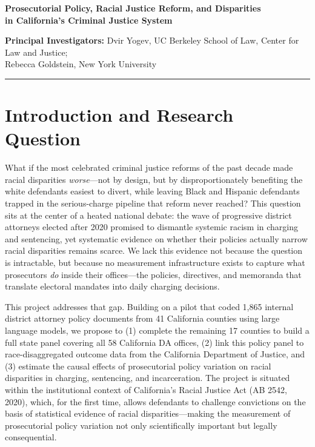 \documentclass[12pt]{article}
\begin{document}
\begin{center}
{\Large \textbf{Prosecutorial Policy, Racial Justice Reform, and Disparities\\in California's Criminal Justice System}}

\vspace{0.5em}
{\normalsize \textbf{Principal Investigators:} Dvir Yogev, UC Berkeley School of Law, Center for Law and Justice;\\Rebecca Goldstein, New York University}
\end{center}

\vspace{0.5em}
\noindent\rule{\textwidth}{0.4pt}

\section{Introduction and Research Question}

What if the most celebrated criminal justice reforms of the past decade made racial disparities \textit{worse}---not by design, but by disproportionately benefiting the white defendants easiest to divert, while leaving Black and Hispanic defendants trapped in the serious-charge pipeline that reform never reached? This question sits at the center of a heated national debate: the wave of progressive district attorneys elected after 2020 promised to dismantle systemic racism in charging and sentencing, yet systematic evidence on whether their policies actually narrow racial disparities remains scarce. We lack this evidence not because the question is intractable, but because no measurement infrastructure exists to capture what prosecutors \textit{do} inside their offices---the policies, directives, and memoranda that translate electoral mandates into daily charging decisions.

This project addresses that gap. Building on a pilot that coded 1,865 internal district attorney policy documents from 41 California counties using large language models, we propose to (1) complete the remaining 17 counties to build a full state panel covering all 58 California DA offices, (2) link this policy panel to race-disaggregated outcome data from the California Department of Justice, and (3) estimate the causal effects of prosecutorial policy variation on racial disparities in charging, sentencing, and incarceration. The project is situated within the institutional context of California's Racial Justice Act (AB 2542, 2020), which, for the first time, allows defendants to challenge convictions on the basis of statistical evidence of racial disparities---making the measurement of prosecutorial policy variation not only scientifically important but legally consequential.
\end{document}
